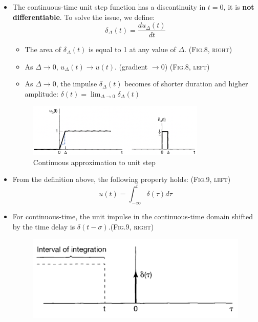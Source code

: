 \documentclass[12pt,a4paper]{article}
\begin{document}
\begin{itemize}
\item The continuous-time unit step function has a discontinuity in $t=0$, it is \textbf{not differentiable}. To solve the issue, we define:\[ \delta_{\Delta}(t) = \frac{du_{\Delta}(t)}{dt} \]
 \begin{itemize}
 \item The area of $\delta_{\Delta}(t)$ is equal to 1 at any value of $\Delta$. (\textsc{Fig.8, right})
 \item As $\Delta \rightarrow 0$, $u_{\Delta}(t) \rightarrow u(t)$. (gradient $\to 0$) (\textsc{Fig.8, left})

 \item As $\Delta \rightarrow 0$, the impulse $\delta_{\Delta}(t)$ becomes of shorter duration and higher amplitude:
 $ \delta(t) = \lim_{\Delta \to 0} \delta_{\Delta}(t) $
 \end{itemize}
\begin{figure}[h] \centering \includegraphics[width=0.8\textwidth]{images/6.5}
\caption{Continuous approximation to unit step} \end{figure}
\item From the definition above, the following property holds: (\textsc{Fig.9, left})
\[ u(t) = \int_{-\infty}^{t} \delta(\tau) d\tau \]
\item For continuous-time, the unit impulse in the continuous-time domain shifted by the time delay is $\delta (t-\sigma)$.(\textsc{Fig.9, right})
 \begin{figure}[H] \centering
 \begin{minipage}[b]{0.45\linewidth} \centering \includegraphics[width=\linewidth]{images/6.6} \end{minipage}

\end{figure}
\end{itemize}
\end{document}
